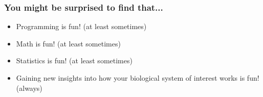 \documentclass{beamer}
\begin{document}
\begin{frame}
  \frametitle{You might be surprised to find that...}

\begin{itemize}

 \item Programming is fun! (at least sometimes)
 \item Math is fun! (at least sometimes)
 \item Statistics is fun! (at least sometimes)
\bigskip
 \item Gaining new insights into how your biological system of interest works is fun! (always)

\end{itemize}

\end{frame}
\end{document}
